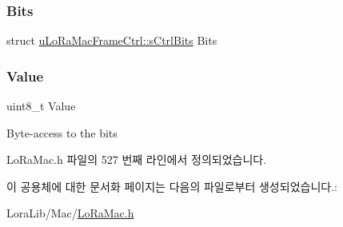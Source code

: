 \subsubsection{\texorpdfstring{Bits}{Bits}}
{\footnotesize\ttfamily struct \mbox{\hyperlink{structu_lo_ra_mac_frame_ctrl_1_1s_ctrl_bits}{u\+Lo\+Ra\+Mac\+Frame\+Ctrl\+::s\+Ctrl\+Bits}} Bits}

\mbox{\label{unionu_lo_ra_mac_frame_ctrl_a88f4d00bdab99ae6f48c7ae0bc468bb4}} 
\subsubsection{\texorpdfstring{Value}{Value}}
{\footnotesize\ttfamily uint8\+\_\+t Value}

Byte-\/access to the bits 

Lo\+Ra\+Mac.\+h 파일의 527 번째 라인에서 정의되었습니다.



이 공용체에 대한 문서화 페이지는 다음의 파일로부터 생성되었습니다.\+:\begin{DoxyCompactItemize}
\item 
Lora\+Lib/\+Mac/\mbox{\hyperlink{_lo_ra_mac_8h}{Lo\+Ra\+Mac.\+h}}\end{DoxyCompactItemize}
